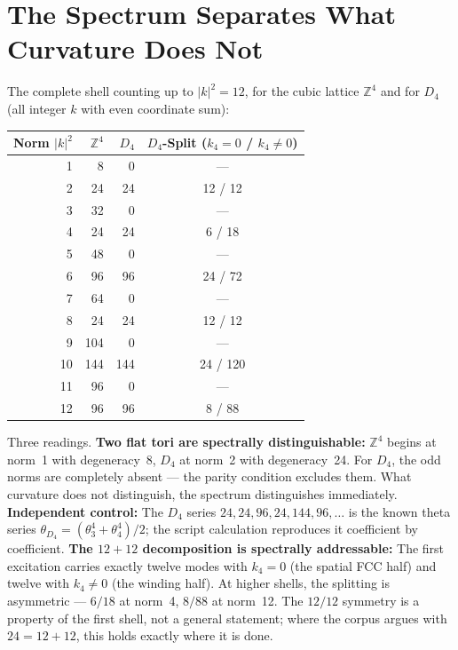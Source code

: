 \section{The Spectrum Separates What Curvature Does Not}

The complete shell counting up to $|k|^2 = 12$, for the cubic
lattice $\mathbb{Z}^4$ and for $D_4$ (all integer $k$ with even
coordinate sum):

\begin{center}
\small
\begin{tabular}{rrrc}
\toprule
Norm $|k|^2$ & $\mathbb{Z}^4$ & $D_4$ & $D_4$-Split ($k_4{=}0$ / $k_4{\ne}0$) \\
\midrule
1 & 8 & 0 & --- \\
2 & 24 & 24 & 12 / 12 \\
3 & 32 & 0 & --- \\
4 & 24 & 24 & 6 / 18 \\
5 & 48 & 0 & --- \\
6 & 96 & 96 & 24 / 72 \\
7 & 64 & 0 & --- \\
8 & 24 & 24 & 12 / 12 \\
9 & 104 & 0 & --- \\
10 & 144 & 144 & 24 / 120 \\
11 & 96 & 0 & --- \\
12 & 96 & 96 & 8 / 88 \\
\bottomrule
\end{tabular}
\end{center}

Three readings. \textbf{Two flat tori are spectrally
distinguishable:} $\mathbb{Z}^4$ begins at norm~1 with degeneracy~8,
$D_4$ at norm~2 with degeneracy~24. For $D_4$, the odd norms
are completely absent --- the parity condition excludes them. What
curvature does not distinguish, the spectrum distinguishes immediately.
\textbf{Independent control:} The $D_4$ series $24,24,96,24,144,96,\dots$
is the known theta series $\theta_{D_4} = (\theta_3^4+\theta_4^4)/2$;
the script calculation reproduces it coefficient by coefficient. \textbf{The
$12+12$ decomposition is spectrally addressable:} The first excitation carries
exactly twelve modes with $k_4 = 0$ (the spatial FCC half) and twelve with
$k_4\ne0$ (the winding half). At higher shells, the splitting is
asymmetric --- $6/18$ at norm~4, $8/88$ at norm~12. The
$12/12$ symmetry is a property of the first shell, not a
general statement; where the corpus argues with $24 = 12+12$, this holds exactly
where it is done.

